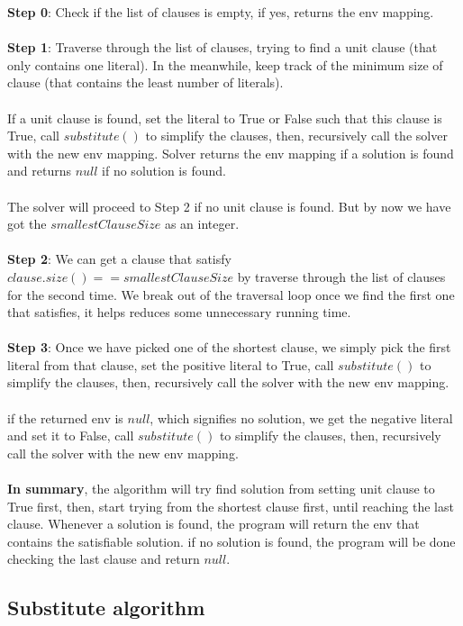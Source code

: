 \documentclass[a4paper,12pt]{article}
\begin{document}
\begin{multicols}{2}
\textbf{Step 0}: Check if the list of clauses is empty, if yes, returns the env mapping.\\
\\
\textbf{Step 1}: Traverse through the list of clauses,
trying to find a unit clause (that only contains one literal). 
In the meanwhile, keep track of the minimum size of clause 
(that contains the least number of literals). \\
\\
If a unit clause is found, set the literal to True or False such that this clause is True, 
call $substitute()$ to simplify the clauses, then, recursively call the solver with the new env mapping.
Solver returns the env mapping if a solution is found and returns $null$ if no solution is found.\\
\\ 
The solver will proceed to Step 2 if no unit clause is found. 
But by now we have got the $smallestClauseSize$ as an integer. \\
\\
\textbf{Step 2}: We can get a clause that satisfy $clause.size() == smallestClauseSize$
by traverse through the list of clauses for the second time. 
We break out of the traversal loop once we find the first one that satisfies, 
it helps reduces some unnecessary running time.\\
\\
\textbf{Step 3}: Once we have picked one of the shortest clause, 
we simply pick the first literal from that clause, set the positive literal to True,
call $substitute()$ to simplify the clauses, then, 
recursively call the solver with the new env mapping.\\
\\
if the returned env is $null$, which signifies no solution, we get the negative literal
and set it to False, call $substitute()$ to simplify the clauses, then, 
recursively call the solver with the new env mapping.\\
\\
\textbf{In summary}, the algorithm will try find solution from setting unit clause to True first,
then, start trying from the shortest clause first, until reaching the last clause.
Whenever a solution is found, the program will return the env that contains the satisfiable solution.
if no solution is found, the program will be done checking the last clause and return $null$.

\subsection*{Substitute algorithm}


\end{multicols}
\end{document}
